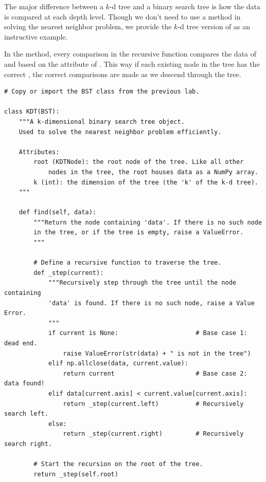 

The major difference between a $k$-d tree and a binary search tree is how the data is compared at each depth level.
Though we don't need to use a  method in solving the nearest neighbor problem, we provide the $k$-d tree version of  as an instructive example.

In the  method, every comparison in the recursive  function compares the data of  and  based on the  attribute of .
This way if each existing node in the tree has the correct , the correct comparisons are made as we descend through the tree.

\begin{lstlisting}
# Copy or import the BST class from the previous lab.

class KDT(BST):
    """A k-dimensional binary search tree object.
    Used to solve the nearest neighbor problem efficiently.

    Attributes:
        root (KDTNode): the root node of the tree. Like all other
            nodes in the tree, the root houses data as a NumPy array.
        k (int): the dimension of the tree (the 'k' of the k-d tree).
    """

    def find(self, data):
        """Return the node containing 'data'. If there is no such node
        in the tree, or if the tree is empty, raise a ValueError.
        """

        # Define a recursive function to traverse the tree.
        def _step(current):
            """Recursively step through the tree until the node containing
            'data' is found. If there is no such node, raise a Value Error.
            """
            if current is None:                     # Base case 1: dead end.
                raise ValueError(str(data) + " is not in the tree")
            elif np.allclose(data, current.value):
                return current                      # Base case 2: data found!
            elif data[current.axis] < current.value[current.axis]:
                return _step(current.left)          # Recursively search left.
            else:
                return _step(current.right)         # Recursively search right.

        # Start the recursion on the root of the tree.
        return _step(self.root)
\end{lstlisting}

